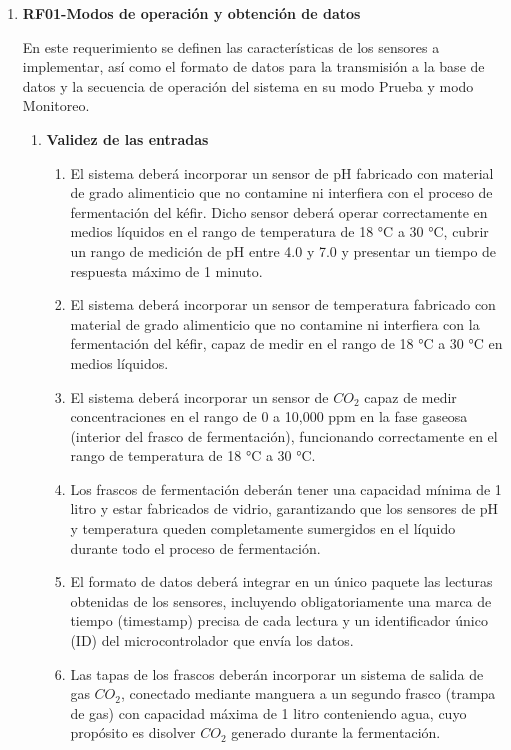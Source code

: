 \begin{enumerate}
    \item \label{it:RF01} \textbf{RF01-Modos de operación y obtención de datos} 
    
        En este requerimiento se definen las características de los sensores a implementar, así como 
        el formato de datos para la transmisión a la base de datos y la secuencia
        de operación del sistema en su modo Prueba y modo Monitoreo.


        \begin{enumerate}
            \item \textbf{Validez de las entradas}
                \begin{enumerate}

                    \item El sistema deberá incorporar un sensor de pH fabricado con material de grado alimenticio que no contamine ni interfiera con el proceso de fermentación del kéfir. Dicho sensor deberá operar correctamente en medios líquidos en el rango de temperatura de 18 °C a 30 °C, cubrir un rango de medición de pH entre 4.0 y 7.0 y presentar un tiempo de respuesta máximo de 1 minuto.

                    \item El sistema deberá incorporar un sensor de temperatura fabricado con material de grado alimenticio que no contamine ni interfiera con la fermentación del kéfir, capaz de medir en el rango de 18 °C a 30 °C en medios líquidos.

                    \item El sistema deberá incorporar un sensor de $CO_{2}$ capaz de medir concentraciones en el rango de 0 a 10,000 ppm en la fase gaseosa (interior del frasco de fermentación), funcionando correctamente en el rango de temperatura de 18 °C a 30 °C.

                    \item Los frascos de fermentación deberán tener una capacidad mínima de 1 litro y estar fabricados de vidrio, garantizando que los sensores de pH y temperatura queden completamente sumergidos en el líquido durante todo el proceso de fermentación.

                    \item El formato de datos deberá integrar en un único paquete las lecturas obtenidas de los sensores, incluyendo obligatoriamente una marca de tiempo (timestamp) precisa de cada lectura y un identificador único (ID) del microcontrolador que envía los datos. 
                    \item Las tapas de los frascos deberán incorporar un sistema de salida de gas $CO_{2}$, conectado mediante manguera a un segundo frasco (trampa de gas) con capacidad máxima de 1 litro conteniendo agua, cuyo propósito es disolver $CO_{2}$ generado durante la fermentación.


\end{enumerate}
\end{enumerate}
\end{enumerate}
